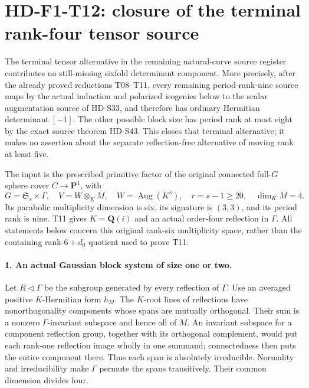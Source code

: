 \section{HD-F1-T12: closure of the terminal rank-four tensor source}
\label{sec:f1-terminal-tensor-closure}

The terminal tensor alternative in the remaining natural-curve
source register contributes no still-missing sixfold determinant
component. More precisely, after the already proved reductions
T08--T11, every remaining period-rank-nine source maps by the
actual induction and polarized isogenies below to the scalar
augmentation source of HD-S33, and therefore has ordinary
Hermitian determinant \([-1]\). The other possible block size
has period rank at most eight by the exact source theorem
HD-S43. This closes that terminal alternative; it makes no
assertion about the separate reflection-free alternative of
moving rank at least five.

The input is the prescribed primitive factor of the original
connected full-\(G\) sphere cover \(C\to\mathbf P^1\), with
\[
 G=\mathfrak S_s\times\Gamma,\quad
 V=W\otimes_K M,\quad W=\operatorname{Aug}(K^s),\quad
 r=s-1\ge20,\quad \dim_KM=4.
 \tag{F1T12.1}
\]
Its parabolic multiplicity dimension is six, its signature is
\((3,3)\), and its period rank is nine. T11 gives
\(K=\mathbf Q(i)\) and an actual order-four reflection in
\(\Gamma\). All statements below concern this original
rank-six multiplicity space, rather than the containing
rank-\(6+d_0\) quotient used to prove T11.

\paragraph{1. An actual Gaussian block system of size one or two.}
Let \(R\lhd\Gamma\) be the subgroup generated by every
reflection of \(\Gamma\). Use an averaged positive
\(K\)-Hermitian form \(h_M\). The \(K\)-root lines of
reflections have nonorthogonality components whose spans
are mutually orthogonal. Their sum is a nonzero
\(\Gamma\)-invariant subspace and hence all of \(M\).
An invariant subspace for a component reflection group,
together with its orthogonal complement, would put each
rank-one reflection image wholly in one summand; connectedness
then puts the entire component there. Thus each span is
absolutely irreducible. Normality and irreducibility make
\(\Gamma\) permute the spans transitively. Their common
dimension divides four.

